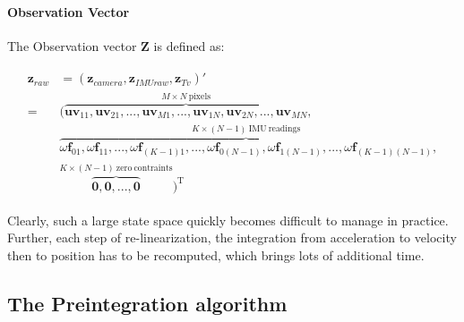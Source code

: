 \documentclass[12pt]{report}   %
\begin{document}
\paragraph{Observation Vector}
The Observation vector $\textbf{Z}$ is defined as:

\begin{align*}
\begin{split}
\textbf{z}_{raw} &= (\textbf{z}_{camera}, \textbf{z}_{IMUraw}, \textbf{z}_{Tv})' \nonumber \\
=& (\overbrace{\textbf{uv}_{11}, \textbf{uv}_{21}, ... , \textbf{uv}_{M1}, ..., \textbf{uv}_{1N}, \textbf{uv}_{2N}, ... , \textbf{uv}_{MN}}^{M \times N \ {\mathrm{pixels}}}, \nonumber \\ 
& \overbrace{\omega\textbf{f}_{01}, \omega\textbf{f}_{11}, ... , \omega\textbf{f}_{(K-1)1}, ..., \omega\textbf{f}_{0(N-1)}, \omega\textbf{f}_{1(N-1)}, ... , \omega\textbf{f}_{(K-1)(N-1)}}^{K \times (N-1) \ {\mathrm{IMU \ readings}}}, \\
& \overbrace{\textbf{0}, \textbf{0}, ... , \textbf{0}}^{K \times (N-1)  \ {\mathrm{ zero \ contraints}}})^{\mathrm{T}}
\end{split}
\end{align*}

Clearly, such a large state space quickly becomes difficult to manage in
practice. Further, each step of re-linearization, the integration from
acceleration to velocity then to position has to be recomputed, which brings
lots of additional time.

\subsection{The Preintegration algorithm}
\end{document}
